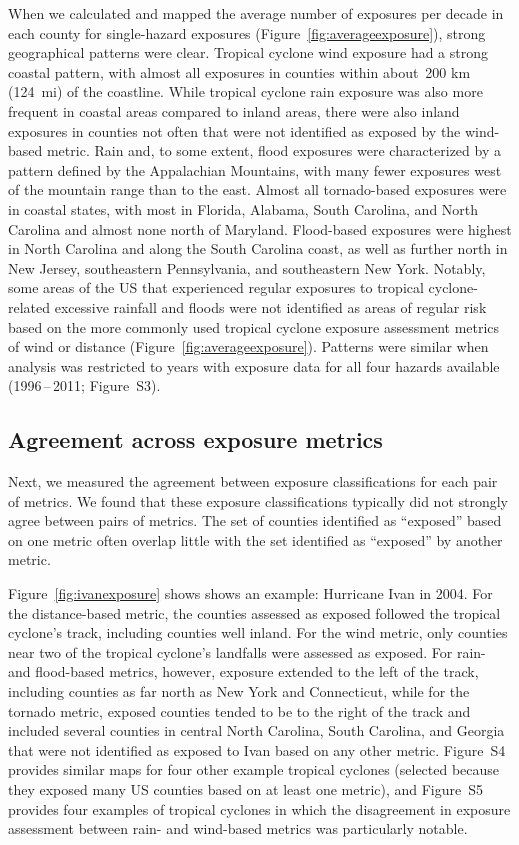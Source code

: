 When we calculated and mapped the average number of exposures per decade in
each county for single-hazard exposures (Figure~\ref{fig:averageexposure}),
strong geographical patterns were clear. Tropical cyclone wind exposure had a
strong coastal pattern, with almost all exposures in counties within about~200
\si{\kilo\metre} (124~mi) of the coastline. While tropical cyclone rain
exposure was also more frequent in coastal areas compared to inland areas,
there were also inland exposures in counties not often  that were not
identified as exposed by the wind-based metric. Rain and, to some extent, flood
exposures were characterized by a pattern defined by the Appalachian Mountains,
with many fewer exposures west of the mountain range than to the east. Almost
all tornado-based exposures were in coastal states, with most in Florida,
Alabama, South Carolina, and North Carolina and almost none north of Maryland.
Flood-based exposures were highest in North Carolina and along the South
Carolina coast, as well as further north in New Jersey, southeastern
Pennsylvania, and southeastern New York. Notably, some areas of the \ac{US}
that experienced regular exposures to tropical cyclone-related excessive
rainfall and floods were not identified as areas of regular risk based on the
more commonly used tropical cyclone exposure assessment metrics of wind or
distance (Figure~\ref{fig:averageexposure}).  Patterns were similar when
analysis was restricted to years with exposure data for all four hazards
available (1996\,--\,2011; Figure~S3). 

\subsection*{Agreement across exposure metrics}

Next, we measured the agreement between exposure classifications for each pair
of metrics. We found that these exposure classifications typically did not
strongly agree between pairs of metrics. The set of counties
identified as ``exposed'' based on one metric often overlap little with
the set identified as ``exposed'' by another metric. 

Figure~\ref{fig:ivanexposure} shows shows an example: Hurricane Ivan in 2004.
For the distance-based metric, the counties assessed as exposed followed the
tropical cyclone's track, including counties well inland. For the wind metric,
only counties near two of the tropical cyclone's landfalls were assessed as
exposed. For rain- and flood-based metrics, however, exposure extended to the
left of the track, including counties as far north as New York and Connecticut,
while for the tornado metric, exposed counties tended to be to the right of the
track and included several counties in central North Carolina, South Carolina,
and Georgia that were not identified as exposed to Ivan based on any other
metric. Figure~S4 provides similar maps for four other example tropical
cyclones (selected because they exposed many \ac{US}  counties based on at
least one metric), and Figure~S5 provides four examples of tropical cyclones in
which the disagreement in exposure assessment between rain- and wind-based
metrics was particularly notable.

